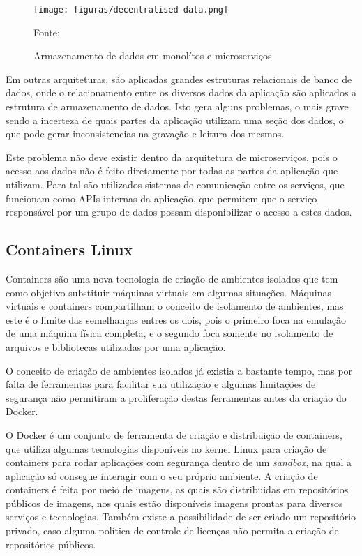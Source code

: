 \begin{figure}[H]
	\centering
	\caption{Armazenamento de dados em monolítos e microserviços}
	\texttt{[image: figuras/decentralised-data.png]}

	\label{fig:db-monolith-microservices}
	\footnotesize Fonte: 
\end{figure}

Em outras arquiteturas, são aplicadas grandes estruturas relacionais de banco
de dados, onde o relacionamento entre os diversos dados da aplicação são
aplicados a estrutura de armazenamento de dados. Isto gera alguns problemas,
o mais grave sendo a incerteza de quais partes da aplicação utilizam uma
seção dos dados, o que pode gerar inconsistencias na gravação e leitura dos
mesmos.

Este problema não deve existir dentro da arquitetura de microserviços, pois o
acesso aos dados não é feito diretamente por todas as partes da aplicação que
utilizam. Para tal são utilizados sistemas de comunicação entre os serviços,
que funcionam como \acp{API} internas da aplicação, que permitem que o serviço
responsável por um grupo de dados possam disponibilizar o acesso a estes dados.

\subsection{Containers Linux}

Containers são uma nova tecnologia de criação de ambientes isolados que tem
como objetivo substituir máquinas virtuais em algumas situações. Máquinas
virtuais e containers compartilham o conceito de isolamento de ambientes, mas
este é o limite das semelhanças entres os dois, pois o primeiro foca na
emulação de uma máquina física completa, e o segundo foca somente no
isolamento de arquivos e bibliotecas utilizadas por uma aplicação.

O conceito de criação de ambientes isolados já existia a bastante tempo, mas
por falta de ferramentas para facilitar sua utilização e algumas limitações
de segurança não permitiram a proliferação destas ferramentas antes da criação
do Docker.

O Docker é um conjunto de ferramenta de criação e distribuição de containers,
que utiliza algumas tecnologias disponíveis no kernel Linux para criação de
containers para rodar aplicações com segurança dentro de um \emph{sandbox},
na qual a aplicação só consegue interagir com o seu próprio ambiente. A criação
de containers é feita por meio de imagens, as quais são distribuidas em
repositórios públicos de imagens, nos quais estão disponíveis imagens prontas
para diversos serviços e tecnologias. Também existe a possibilidade de ser
criado um repositório privado, caso alguma política de controle de licenças
não permita a criação de repositórios públicos.

